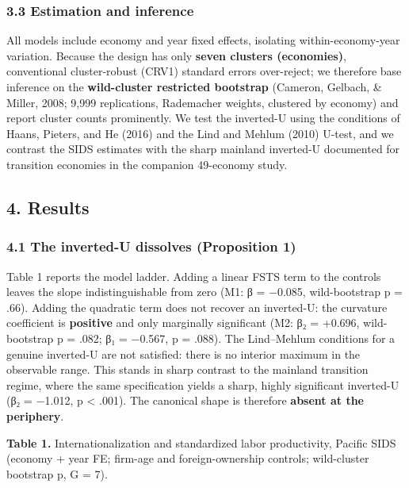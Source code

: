 \documentclass[
  12pt,a4paper]{article}
\begin{document}
\hypertarget{estimation-and-inference}{%
\subsubsection{3.3 Estimation and
inference}\label{estimation-and-inference}}

All models include economy and year fixed effects, isolating
within-economy-year variation. Because the design has only \textbf{seven
clusters (economies)}, conventional cluster-robust (CRV1) standard
errors over-reject; we therefore base inference on the
\textbf{wild-cluster restricted bootstrap} (Cameron, Gelbach, \& Miller,
2008; 9,999 replications, Rademacher weights, clustered by economy) and
report cluster counts prominently. We test the inverted-U using the
conditions of Haans, Pieters, and He (2016) and the Lind and Mehlum
(2010) U-test, and we contrast the SIDS estimates with the sharp
mainland inverted-U documented for transition economies in the companion
49-economy study.

\hypertarget{results}{%
\subsection{4. Results}\label{results}}

\hypertarget{the-inverted-u-dissolves-proposition-1}{%
\subsubsection{4.1 The inverted-U dissolves (Proposition
1)}\label{the-inverted-u-dissolves-proposition-1}}

Table 1 reports the model ladder. Adding a linear FSTS term to the
controls leaves the slope indistinguishable from zero (M1: β = −0.085,
wild-bootstrap p = .66). Adding the quadratic term does not recover an
inverted-U: the curvature coefficient is \textbf{positive} and only
marginally significant (M2: β₂ = +0.696, wild-bootstrap p = .082; β₁ =
−0.567, p = .088). The Lind--Mehlum conditions for a genuine inverted-U
are not satisfied: there is no interior maximum in the observable
range. This stands in sharp contrast to the mainland transition regime,
where the same specification yields a sharp, highly significant
inverted-U (β₂ = −1.012, p \textless{} .001). The canonical shape is
therefore \textbf{absent at the periphery}.

\textbf{Table 1.} Internationalization and standardized labor
productivity, Pacific SIDS (economy + year FE; firm-age and
foreign-ownership controls; wild-cluster bootstrap p, G = 7).
\end{document}

